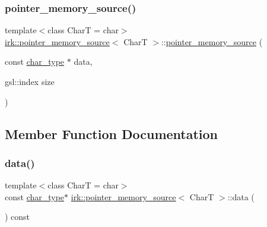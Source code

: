 \subsubsection{\texorpdfstring{pointer\+\_\+memory\+\_\+source()}{pointer\_memory\_source()}\hspace{0.1cm}{\footnotesize\ttfamily [2/2]}}
{\footnotesize\ttfamily template$<$class CharT  = char$>$ \\
\mbox{\hyperlink{classirk_1_1pointer__memory__source}{irk\+::pointer\+\_\+memory\+\_\+source}}$<$ CharT $>$\+::\mbox{\hyperlink{classirk_1_1pointer__memory__source}{pointer\+\_\+memory\+\_\+source}} (\begin{DoxyParamCaption}\item[{const \mbox{\hyperlink{classirk_1_1pointer__memory__source_a4b778df8efee229fdafbd4de413dbf61}{char\+\_\+type}} $\ast$}]{data,  }\item[{gsl\+::index}]{size }\end{DoxyParamCaption})\hspace{0.3cm}{\ttfamily [inline]}}



\subsection{Member Function Documentation}
\mbox{\label{classirk_1_1pointer__memory__source_a563d794f484d7e6812714e4fe23bcd08}} 
\subsubsection{\texorpdfstring{data()}{data()}}
{\footnotesize\ttfamily template$<$class CharT  = char$>$ \\
const \mbox{\hyperlink{classirk_1_1pointer__memory__source_a4b778df8efee229fdafbd4de413dbf61}{char\+\_\+type}}$\ast$ \mbox{\hyperlink{classirk_1_1pointer__memory__source}{irk\+::pointer\+\_\+memory\+\_\+source}}$<$ CharT $>$\+::data (\begin{DoxyParamCaption}{ }\end{DoxyParamCaption}) const\hspace{0.3cm}{\ttfamily [inline]}}

\mbox{\label{classirk_1_1pointer__memory__source_a8571616fa6e13d6f7330bf6b25a47d72}} 
